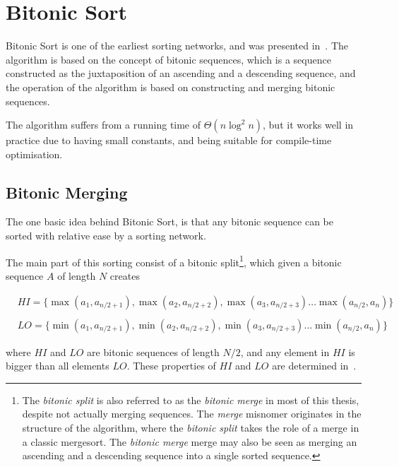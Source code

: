 \FloatBarrier
\section{Bitonic Sort} 
\label{sec:BitonicSort}

Bitonic Sort is one of the earliest sorting networks, and was presented in~. The algorithm is based on the concept of bitonic sequences, which is a sequence constructed as the juxtaposition of an ascending and a descending sequence, and the operation of the algorithm is based on constructing and merging bitonic sequences.

The algorithm suffers from a running time of $\Theta(n \log^2 n)$, but it works well in practice due to having small constants, and being suitable for compile-time optimisation.

\subsection{Bitonic Merging}

The one basic idea behind Bitonic Sort, is that any bitonic sequence can be sorted with relative ease by a sorting network.

The main part of this sorting consist of a bitonic split\footnote{
The \emph{bitonic split} is also referred to as the \emph{bitonic merge} in most of this thesis, despite not actually merging sequences. The \emph{merge} misnomer originates in the structure of the algorithm, where the \emph{bitonic split} takes the role of a merge in a classic mergesort. The \emph{bitonic merge} merge may also be seen as merging an ascending and a descending sequence into a single sorted sequence.
}, which given a bitonic sequence $A$ of length $N$ creates

\begin{equation}
\begin{split}
&HI = \{\max(a_1, a_{n/2+1}), \max(a_2, a_{n/2+2}), \max(a_3, a_{n/2+3}) \dots \max(a_{n/2}, a_n)\}\\
\\
&LO = \{\min(a_1, a_{n/2+1}), \min(a_2, a_{n/2+2}), \min(a_3, a_{n/2+3}) \dots \min(a_{n/2}, a_n)\}
\end{split}
\end{equation}

\noindent
where $HI$ and $LO$ are bitonic sequences of length $N/2$, and any element in $HI$ is bigger than all elements $LO$. These properties of $HI$ and $LO$ are determined in~. 


